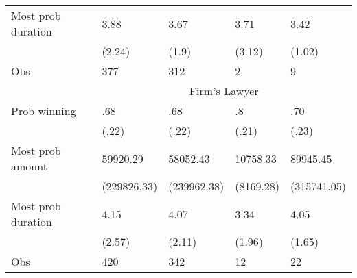 \begin{tabular}{rrrrr}
\multicolumn{1}{l}{Most prob duration} & \multicolumn{1}{l}{3.88} & \multicolumn{1}{l}{3.67} & \multicolumn{1}{l}{3.71} & \multicolumn{1}{l}{3.42} \\
\multicolumn{1}{l}{} & \multicolumn{1}{l}{(2.24)} & \multicolumn{1}{l}{(1.9)} & \multicolumn{1}{l}{(3.12)} & \multicolumn{1}{l}{(1.02)} \\
\multicolumn{1}{l}{Obs} & \multicolumn{1}{l}{377} & \multicolumn{1}{l}{312} & \multicolumn{1}{l}{2} & \multicolumn{1}{l}{9} \\
\midrule
\multicolumn{1}{l}{} & \multicolumn{4}{c}{Firm's Lawyer} \\
\midrule
\midrule
\multicolumn{1}{l}{Prob winning} & \multicolumn{1}{l}{.68} & \multicolumn{1}{l}{.68} & \multicolumn{1}{l}{.8} & \multicolumn{1}{l}{.70} \\
\multicolumn{1}{l}{} & \multicolumn{1}{l}{(.22)} & \multicolumn{1}{l}{(.22)} & \multicolumn{1}{l}{(.21)} & \multicolumn{1}{l}{(.23)} \\
\multicolumn{1}{l}{Most prob amount} & \multicolumn{1}{l}{59920.29} & \multicolumn{1}{l}{58052.43} & \multicolumn{1}{l}{10758.33} & \multicolumn{1}{l}{89945.45} \\
\multicolumn{1}{l}{} & \multicolumn{1}{l}{(229826.33)} & \multicolumn{1}{l}{(239962.38)} & \multicolumn{1}{l}{(8169.28)} & \multicolumn{1}{l}{(315741.05)} \\
\multicolumn{1}{l}{Most prob duration} & \multicolumn{1}{l}{4.15} & \multicolumn{1}{l}{4.07} & \multicolumn{1}{l}{3.34} & \multicolumn{1}{l}{4.05} \\
\multicolumn{1}{l}{} & \multicolumn{1}{l}{(2.57)} & \multicolumn{1}{l}{(2.11)} & \multicolumn{1}{l}{(1.96)} & \multicolumn{1}{l}{(1.65)} \\
\multicolumn{1}{l}{Obs} & \multicolumn{1}{l}{420} & \multicolumn{1}{l}{342} & \multicolumn{1}{l}{12} & \multicolumn{1}{l}{22} \\
\bottomrule
\bottomrule
\end{tabular}%
